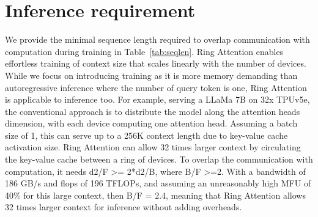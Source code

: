 \documentclass{article}
\newif\ifanonymous
\newcommand{\oursabb}{{Ring Attention}\xspace}
\begin{document}
\section{Inference requirement}
We provide the minimal sequence length required to overlap communication with computation during training in Table~\ref{tab:seqlen}. \oursabb enables effortless training of context size that scales linearly with the number of devices. While we focus on introducing training as it is more memory demanding than autoregressive inference where the number of query token is one, \oursabb is applicable to inference too. For example, serving a LLaMa 7B on 32x TPUv5e, the conventional approach is to distribute the model along the attention heads dimension, with each device computing one attention head. Assuming a batch size of 1, this can serve up to a 256K context length due to key-value cache activation size. Ring Attention can allow 32 times larger context by circulating the key-value cache between a ring of devices. To overlap the communication with computation, it needs d2/F >= 2*d2/B, where B/F >=2. With a bandwidth of 186 GB/s and flops of 196 TFLOPs, and assuming an unreasonably high MFU of 40\% for this large context, then B/F = 2.4, meaning that Ring Attention allows 32 times larger context for inference without adding overheads.

\ifanonymous
\end{document}
